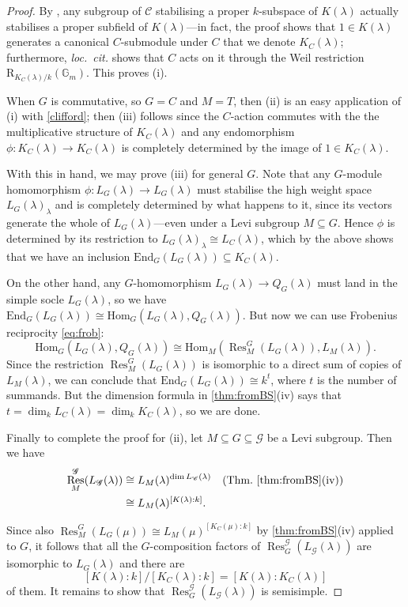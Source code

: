 \documentclass[11pt,reqno]{amsart}
\theoremstyle{definition}
\theoremstyle{remark}
\theoremstyle{definition}
\theoremstyle{plain}
\DeclareMathOperator{\Res}{Res}
\newcommand{\R}{\mathrm{R}}
\newcommand{\G}{\mathscr{G}}
\newcommand{\Hom}{\mathrm{Hom}}
\newcommand{\End}{\mathrm{End}}
\newcommand{\Gm}{\mathbb{G}_m}
\newcommand{\C}{\mathscr{C}}
\begin{document}
\begin{proof}
By \cite[Lem.~5.10]{BS22},  any subgroup of $\C$ stabilising a proper $k$-subspace of $K(\lambda)$ 
actually stabilises a proper subfield of $K(\lambda)$---in fact, the proof shows that $1\in K(\lambda)$ generates a canonical $C$-submodule under $C$ that we denote $K_{C}(\lambda)$; furthermore, \emph{loc.~cit.} shows that $C$ acts on it through the Weil restriction $\R_{K_C(\lambda)/k}(\Gm)$.
This proves (i).

When $G$ is commutative, so $G=C$ and $M=T$, then (ii) is an easy application of (i) with \cref{clifford}; then (iii) follows since the $C$-action commutes with the the multiplicative structure of $K_C(\lambda)$ and any endomorphism $\phi:K_C(\lambda)\to K_C(\lambda)$ is completely determined by the image of $1\in K_C(\lambda)$.

With this in hand, we may prove  (iii) for general $G$. Note that any $G$-module homomorphism $\phi:L_G(\lambda)\to L_G(\lambda)$ must stabilise the high weight space $L_G(\lambda)_\lambda$ and is completely determined by what happens to it, since its vectors generate the whole of $L_G(\lambda)$---even under a Levi subgroup $M\subseteq G$.
Hence $\phi$ is determined by its restriction to $L_G(\lambda)_\lambda\cong L_C(\lambda)$, which by the above shows that we have an inclusion $\End_G(L_G(\lambda))\subseteq K_C(\lambda)$.

On the other hand, any $G$-homomorphism $L_G(\lambda) \to Q_G(\lambda)$ must land in the simple socle $L_G(\lambda)$, so we have $\End_G(L_G(\lambda))\cong \Hom_G(L_G(\lambda),Q_G(\lambda))$.
But now we can use Frobenius reciprocity \eqref{eq:frob}:
$$
\Hom_G(L_G(\lambda),Q_G(\lambda)) \cong \Hom_M(\Res^G_M(L_G(\lambda)),L_M(\lambda)).
$$
Since the restriction $\Res^G_M(L_G(\lambda))$ is isomorphic to a direct sum of copies of $L_M(\lambda)$, we can conclude that $\End_G(L_G(\lambda)) \cong k^t$, where $t$ is the number of summands. 
But the dimension formula in \cref{thm:fromBS}(iv) says that 
$t = \dim_k L_C(\lambda) = \dim_k K_C(\lambda)$, so we are done.

Finally to complete the proof for (ii), let $M\subseteq G\subseteq \G$ be a Levi subgroup. Then we have
\begin{align*}\Res^\G_M(L_\G(\lambda))&\cong L_M(\lambda)^{\dim L_\C(\lambda)}&{\text{(Thm.~\ref{thm:fromBS}(iv))}}\\
&\cong L_M(\lambda)^{[K(\lambda):k]}.
\end{align*}

Since also $\Res^G_M(L_G(\mu))\cong L_M(\mu)^{[K_C(\mu):k]}$ by \cref{thm:fromBS}(iv) applied to $G$, it follows that all the $G$-composition factors of $\Res^\G_G(L_\G(\lambda))$ are isomorphic to $L_G(\lambda)$ and there are $$[K(\lambda):k]/[K_C(\lambda):k]=[K(\lambda):K_C(\lambda)]$$ of them. It remains to show that $\Res^\G_G(L_\G(\lambda))$ is semisimple.


\end{proof}
\end{document}
